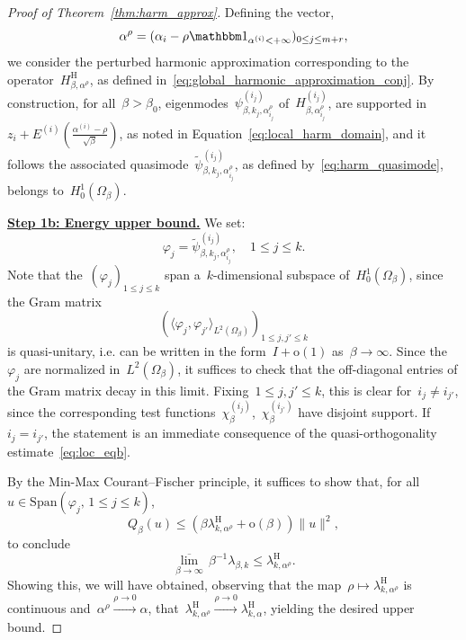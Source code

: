 \documentclass[10pt]{article}
\newcommand{\1}{\mathbbm 1}
\newcommand{\epsLimit}[1]{\alpha^{(#1)}} %
\newcommand{\halfSpace}[1]{E^{(#1)}}
\newcommand{\shift}{\rho} %
\renewcommand{\o}{\mathrm{o}}
\begin{document}
\begin{proof}[Proof of Theorem~\ref{thm:harm_approx}]
        Defining the vector,
        \[\alpha^\shift = (\alpha_i - \shift\1_{\epsLimit{i} < +\infty})_{0\leq j\leq m+r},\]
        we consider the perturbed harmonic approximation corresponding to the operator~$H_{\beta,\alpha^\shift}^{\mathrm H}$, as defined in~\eqref{eq:global_harmonic_approximation_conj}.
        By construction, for all~$\beta>\beta_0$, eigenmodes~$\psi_{\beta,k_j,\alpha^\shift_{i_j}}^{(i_j)}$ of~$H_{\beta,\alpha^\shift_{i_j}}^{(i_j)}$, are supported in
        $z_i + \halfSpace{i}\left(\frac{\epsLimit{i}-\shift}{\sqrt\beta}\right)$, 
        as noted in Equation~\eqref{eq:local_harm_domain}, and it follows the associated quasimode~$\widetilde\psi_{\beta,k_j,\alpha^\shift_{i_j}}^{(i_j)}$, as defined by~\eqref{eq:harm_quasimode}, belongs to~$H_0^1(\Omega_\beta)$.
        
        {\underline{\bf Step 1b: Energy upper bound.}\newline}
        We set:
        \[\varphi_j = \widetilde\psi_{\beta,k_j,\alpha^\shift_{i_j}}^{(i_j)}, \quad 1\leq j\leq k.\]
        Note that the~$(\varphi_j)_{1\leq j \leq k}$ span a~$k$-dimensional subspace of~$H_0^1(\Omega_\beta)$, since the Gram matrix~$$\left(\langle \varphi_j,\varphi_{j'}\rangle_{L^2(\Omega_\beta)}\right)_{1\leq j,j'\leq k}$$ is quasi-unitary, i.e. can be written in the form~$I + \o(1)$ as~$\beta\to\infty$. Since the~$\varphi_j$ are normalized in~$L^2(\Omega_\beta)$, it suffices to check that the off-diagonal entries of the Gram matrix decay in this limit.
        Fixing~$1\leq j,j'\leq k$, this is clear for~$i_j \neq i_{j'}$, since the corresponding test functions~$\chi_\beta^{(i_j)}$,~$\chi_\beta^{(i_{j'})}$ have disjoint support. If~$i_j = i_{j'}$, the statement is an immediate consequence of the quasi-orthogonality estimate~\eqref{eq:loc_eqb}.%
        
        By the Min-Max Courant--Fischer principle, it suffices to show that, for all~$u\in \mathrm{Span}(\varphi_j,\,1\leq j \leq k)$,
        \begin{equation}
            \label{eq:thm1_ub}
            Q_\beta(u) \leq (\beta\lambda_{k,\alpha^\shift}^{\mathrm{H}}+\o(\beta))\|u\|^2,
        \end{equation}
        to conclude
        \[\underset{\beta\to\infty}{\overline\lim}\,\beta^{-1}\lambda_{\beta,k} \leq \lambda_{k,\alpha^\shift}^{\mathrm{H}}.\]
        Showing this, we will have obtained, observing that the map~$\shift\mapsto\lambda_{k,\alpha^\shift}^{\mathrm{H}}$ is continuous and~$\alpha^\shift \xrightarrow{\shift\to 0} \alpha$, 
        that~$\lambda_{k,\alpha^\shift}^{\mathrm{H}}\xrightarrow{\shift\to 0} \lambda_{k,\alpha}^{\mathrm H}$, yielding the desired upper bound.


\end{proof}
\end{document}
